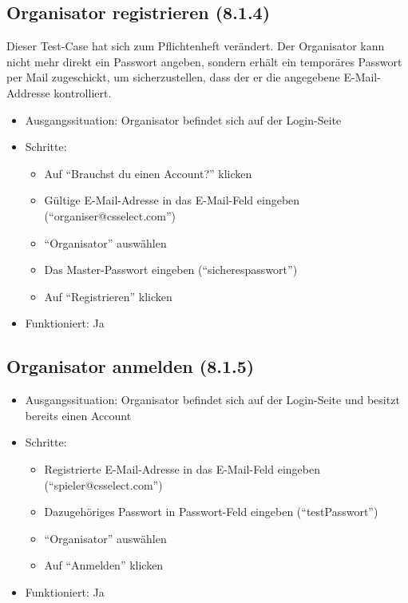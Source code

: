 \documentclass[a4paper]{scrreprt}
\begin{document}
            \subsection{Organisator registrieren (8.1.4)}
            Dieser Test-Case hat sich zum Pflichtenheft verändert.
            Der Organisator kann nicht mehr direkt ein Passwort angeben, sondern erhält ein temporäres Passwort per Mail zugeschickt,
            um sicherzustellen, dass der er die angegebene E-Mail-Addresse kontrolliert.
            \begin{itemize}
                \item Ausgangssituation: Organisator befindet sich auf der Login-Seite
                \item Schritte:
                    \begin{itemize}
                        \item Auf \enquote{Brauchst du einen Account?} klicken
                        \item Gültige E-Mail-Adresse in das E-Mail-Feld eingeben (\enquote{organiser@csselect.com})
                        \item \enquote{Organisator} auswählen
                        \item Das Master-Passwort eingeben (\enquote{sicherespasswort})
                        \item Auf \enquote{Registrieren} klicken
                    \end{itemize}
            \item Funktioniert: Ja
            \end{itemize}

            \subsection{Organisator anmelden (8.1.5)}
            \begin{itemize}
                \item Ausgangssituation: Organisator befindet sich auf der Login-Seite und besitzt bereits einen Account
                \item Schritte:
                    \begin{itemize}
                        \item Registrierte E-Mail-Adresse in das E-Mail-Feld eingeben (\enquote{spieler@csselect.com})
                        \item Dazugehöriges Passwort in Passwort-Feld eingeben (\enquote{testPasswort})
                        \item \enquote{Organisator} auswählen
                        \item Auf \enquote{Anmelden} klicken
                    \end{itemize}
                \item Funktioniert: Ja
            \end{itemize}
\end{document}

